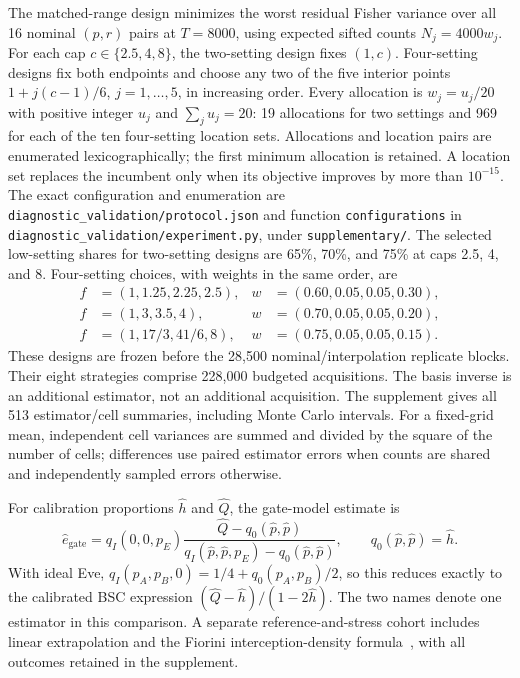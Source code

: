 The matched-range design minimizes the worst residual Fisher variance over all
16 nominal $(p,r)$ pairs at $T=8000$, using expected sifted counts $N_j=4000w_j$.
For each cap $c\in\{2.5,4,8\}$, the two-setting design fixes $(1,c)$.
Four-setting designs fix both endpoints and choose any two of the five interior
points $1+j(c-1)/6$, $j=1,\ldots,5$, in increasing order. Every allocation is
$w_j=u_j/20$ with positive integer $u_j$ and $\sum_j u_j=20$: 19 allocations
for two settings and 969 for each of the ten four-setting location sets.
Allocations and location pairs are enumerated lexicographically; the first minimum
allocation is retained. A location set replaces the incumbent only when its
objective improves by more than $10^{-15}$. The exact configuration and enumeration
are \texttt{diagnostic\_validation/protocol.json} and function
\texttt{configurations} in \texttt{diagnostic\_validation/experiment.py}, under
\texttt{supplementary/}. The selected
low-setting shares for two-setting designs are 65\%, 70\%, and 75\% at caps
2.5, 4, and 8. Four-setting choices, with weights in the same order, are
\begin{align*}
 f&=(1,1.25,2.25,2.5), & w&=(0.60,0.05,0.05,0.30),\\
 f&=(1,3,3.5,4), & w&=(0.70,0.05,0.05,0.20),\\
 f&=(1,17/3,41/6,8), & w&=(0.75,0.05,0.05,0.15).
\end{align*}
These designs are frozen before the 28,500 nominal/interpolation replicate blocks.
Their eight strategies comprise 228,000 budgeted acquisitions. The basis inverse
is an additional estimator, not an additional acquisition. The supplement gives
all 513 estimator/cell summaries, including Monte Carlo intervals. For a
fixed-grid mean, independent cell variances are summed and divided by the square
of the number of cells; differences use paired estimator errors when counts are
shared and independently sampled errors otherwise.

For calibration proportions $\widehat h$ and $\widehat Q$, the gate-model estimate is
\begin{equation}
 \widehat e_{\mathrm{gate}}=
 q_I(0,0,p_E)\frac{\widehat Q-q_0(\widehat p,\widehat p)}
 {q_I(\widehat p,\widehat p,p_E)-q_0(\widehat p,\widehat p)},
 \qquad q_0(\widehat p,\widehat p)=\widehat h.
 \label{eq:calgate}
\end{equation}
With ideal Eve, $q_I(p_A,p_B,0)=1/4+q_0(p_A,p_B)/2$, so this reduces exactly
to the calibrated BSC expression $(\widehat Q-\widehat h)/(1-2\widehat h)$.
The two names denote one estimator in this comparison. A separate reference-and-stress
cohort includes linear extrapolation and the Fiorini interception-density
formula~\cite{fiorini2026}, with all outcomes retained in the supplement.


